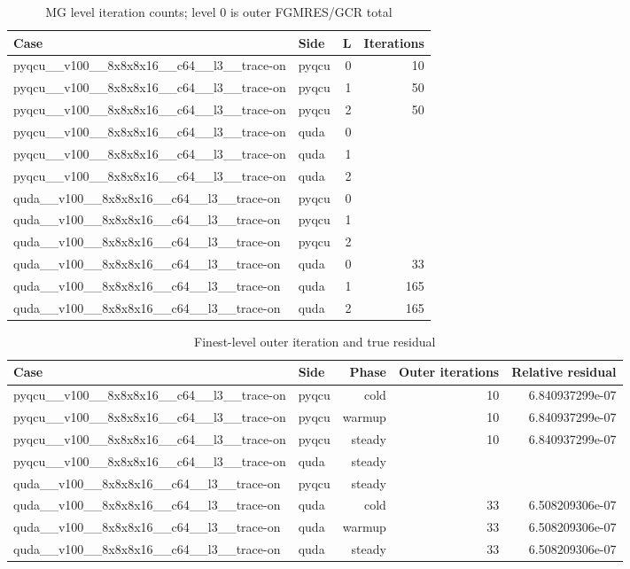 \begin{table}[htbp]
\centering
\caption{MG level iteration counts; level 0 is outer FGMRES/GCR total}
\small
\begin{tabular}{@{}llrr@{}}
\toprule
Case & Side & L & Iterations \\
\midrule
pyqcu\_\_v100\_\_8x8x8x16\_\_c64\_\_l3\_\_trace-on & pyqcu & 0 & 10 \\
pyqcu\_\_v100\_\_8x8x8x16\_\_c64\_\_l3\_\_trace-on & pyqcu & 1 & 50 \\
pyqcu\_\_v100\_\_8x8x8x16\_\_c64\_\_l3\_\_trace-on & pyqcu & 2 & 50 \\
pyqcu\_\_v100\_\_8x8x8x16\_\_c64\_\_l3\_\_trace-on & quda & 0 &  \\
pyqcu\_\_v100\_\_8x8x8x16\_\_c64\_\_l3\_\_trace-on & quda & 1 &  \\
pyqcu\_\_v100\_\_8x8x8x16\_\_c64\_\_l3\_\_trace-on & quda & 2 &  \\
quda\_\_v100\_\_8x8x8x16\_\_c64\_\_l3\_\_trace-on & pyqcu & 0 &  \\
quda\_\_v100\_\_8x8x8x16\_\_c64\_\_l3\_\_trace-on & pyqcu & 1 &  \\
quda\_\_v100\_\_8x8x8x16\_\_c64\_\_l3\_\_trace-on & pyqcu & 2 &  \\
quda\_\_v100\_\_8x8x8x16\_\_c64\_\_l3\_\_trace-on & quda & 0 & 33 \\
quda\_\_v100\_\_8x8x8x16\_\_c64\_\_l3\_\_trace-on & quda & 1 & 165 \\
quda\_\_v100\_\_8x8x8x16\_\_c64\_\_l3\_\_trace-on & quda & 2 & 165 \\
\bottomrule
\end{tabular}
\end{table}

\begin{table}[htbp]
\centering
\caption{Finest-level outer iteration and true residual}
\small
\begin{tabular}{@{}llrrr@{}}
\toprule
Case & Side & Phase & Outer iterations & Relative residual \\
\midrule
pyqcu\_\_v100\_\_8x8x8x16\_\_c64\_\_l3\_\_trace-on & pyqcu & cold & 10 & 6.840937299e-07 \\
pyqcu\_\_v100\_\_8x8x8x16\_\_c64\_\_l3\_\_trace-on & pyqcu & warmup & 10 & 6.840937299e-07 \\
pyqcu\_\_v100\_\_8x8x8x16\_\_c64\_\_l3\_\_trace-on & pyqcu & steady & 10 & 6.840937299e-07 \\
pyqcu\_\_v100\_\_8x8x8x16\_\_c64\_\_l3\_\_trace-on & quda & steady &  &  \\
quda\_\_v100\_\_8x8x8x16\_\_c64\_\_l3\_\_trace-on & pyqcu & steady &  &  \\
quda\_\_v100\_\_8x8x8x16\_\_c64\_\_l3\_\_trace-on & quda & cold & 33 & 6.508209306e-07 \\
quda\_\_v100\_\_8x8x8x16\_\_c64\_\_l3\_\_trace-on & quda & warmup & 33 & 6.508209306e-07 \\
quda\_\_v100\_\_8x8x8x16\_\_c64\_\_l3\_\_trace-on & quda & steady & 33 & 6.508209306e-07 \\
\bottomrule
\end{tabular}
\end{table}

